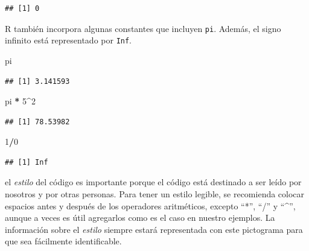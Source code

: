 \documentclass[]{book}
\makeatletter
\newenvironment{Shaded}{\begin{snugshade}}{\end{snugshade}}
\newcommand{\DecValTok}[1]{\textcolor[rgb]{0.00,0.00,0.81}{#1}}
\newcommand{\StringTok}[1]{\textcolor[rgb]{0.31,0.60,0.02}{#1}}
\newcommand{\OperatorTok}[1]{\textcolor[rgb]{0.81,0.36,0.00}{\textbf{#1}}}
\newcommand{\NormalTok}[1]{#1}
\newenvironment{kframe}{%
\medskip{}
\setlength{\fboxsep}{.8em}
 \def\at@end@of@kframe{}%
 \ifinner\ifhmode%
  \def\at@end@of@kframe{\end{minipage}}%
  \begin{minipage}{\columnwidth}%
 \fi\fi%
 \def\FrameCommand##1{\hskip\@totalleftmargin \hskip-\fboxsep
 \colorbox{shadecolor}{##1}\hskip-\fboxsep
     \hskip-\linewidth \hskip-\@totalleftmargin \hskip\columnwidth}%
 \MakeFramed {\advance\hsize-\width
   \@totalleftmargin\z@ \linewidth\hsize
   \@setminipage}}%
 {\par\unskip\endMakeFramed%
 \at@end@of@kframe}
\newenvironment{rmdblock}[1]
  {
  \begin{itemize}
  \renewcommand{\labelitemi}{
    \raisebox{-.7\height}[0pt][0pt]{
      {\setkeys{Gin}{width=3em,keepaspectratio}\texttt{[image: myIcons/\#1]}} %
    }
  }
  \setlength{\fboxsep}{1em}
  \begin{kframe}
  \item
  }
  {
  \end{kframe}
  \end{itemize}
  }
\newenvironment{rmdstyle}     %
  {\begin{rmdblock}{style}}   %
  {\end{rmdblock}}            %
\makeatother
\begin{document}
\begin{Shaded}
\end{Shaded}

\begin{verbatim}
## [1] 0
\end{verbatim}

R también incorpora algunas constantes que incluyen \texttt{pi}. Además,
el signo infinito está representado por \texttt{Inf}.

\begin{Shaded}
\begin{Highlighting}[]
\NormalTok{pi}
\end{Highlighting}
\end{Shaded}

\begin{verbatim}
## [1] 3.141593
\end{verbatim}

\begin{Shaded}
\begin{Highlighting}[]
\NormalTok{pi }\OperatorTok{*}\StringTok{ }\DecValTok{5}\OperatorTok{^}\DecValTok{2}
\end{Highlighting}
\end{Shaded}

\begin{verbatim}
## [1] 78.53982
\end{verbatim}

\begin{Shaded}
\begin{Highlighting}[]
\DecValTok{1}\OperatorTok{/}\DecValTok{0}
\end{Highlighting}
\end{Shaded}

\begin{verbatim}
## [1] Inf
\end{verbatim}

\begin{rmdstyle}
el \emph{estilo} del código es importante porque el código está
destinado a ser leído por nosotros y por otras personas. Para tener un
estilo legible, se recomienda colocar espacios antes y después de los
operadores aritméticos, excepto ``*'', ``/'' y ``\^{}'', aunque a veces
es útil agregarlos como es el caso en nuestro ejemplos. La información
sobre el \emph{estilo} siempre estará representada con este pictograma
para que sea fácilmente identificable.
\end{rmdstyle}
\end{document}
